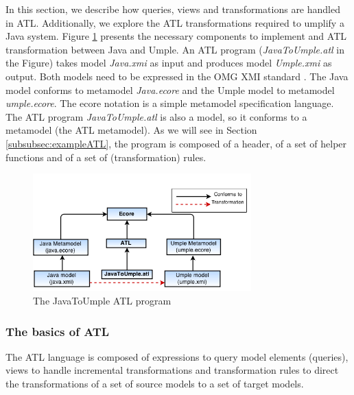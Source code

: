 In this section, we describe how queries, views and transformations are handled in ATL. Additionally, we explore the ATL transformations required to umplify a Java system. Figure \ref{fig:atl} presents the necessary components to implement and ATL transformation between Java and Umple. An ATL program (\textit{JavaToUmple.atl} in the Figure) takes model \textit{Java.xmi} as input and produces model \textit{Umple.xmi} as output. Both models need to be expressed in the OMG XMI standard \cite{xmispec}. The Java model conforms to metamodel \textit{Java.ecore} and the Umple model to metamodel \textit{umple.ecore}. The ecore \cite{ecore} notation is a simple metamodel specification language. The ATL program \textit{JavaToUmple.atl} is also a model, so it conforms to a metamodel (the ATL metamodel). As we will see in Section \ref{subsubsec:exampleATL}, the program is composed of a header, of a set of helper functions and of a set of (transformation) rules.

\begin{figure}[h]
\centering
\includegraphics[width=0.75\textwidth]{Figures/ATL_PROGRAM.png} 
\caption{The JavaToUmple ATL program}
\label{fig:atl}
\end{figure}

\subsubsection{The basics of ATL}

The ATL language is composed of expressions to query model elements (queries), views to handle incremental transformations and transformation rules to direct the transformations of  a set of source models to a set of target models.

